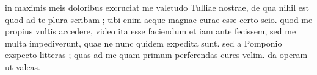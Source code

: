 


in maximis meis doloribus excruciat me valetudo Tulliae nostrae, de qua nihil est quod ad te plura scribam ; tibi enim aeque magnae curae esse certo scio. quod me propius vultis accedere, video ita esse faciendum et iam ante fecissem, sed me multa impediverunt, quae ne nunc quidem expedita sunt. sed a Pomponio exspecto litteras ; quas ad me quam primum perferendas cures velim. da operam ut
valeas.
